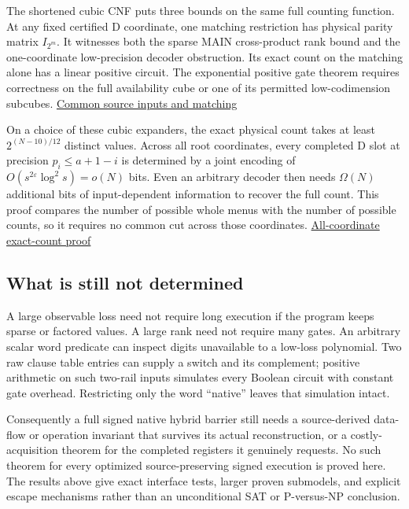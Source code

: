 \documentclass[
  11pt,
]{article}
\begin{document}
The shortened cubic CNF puts three bounds on the same full counting
function. At any fixed certified D coordinate, one matching restriction
has physical parity matrix \(I_{2^m}\). It witnesses both the sparse
MAIN cross-product rank bound and the one-coordinate low-precision
decoder obstruction. Its exact count on the matching alone has a linear
positive circuit. The exponential positive gate theorem requires
correctness on the full availability cube or one of its permitted
low-codimension subcubes. \hyperref[v8-section-common-native-family]{Common
source inputs and matching}

On a choice of these cubic expanders, the exact physical count takes at
least \(2^{(N-10)/12}\) distinct values. Across all root coordinates,
every completed D slot at precision \(p_i\le a+1-i\) is determined by a
joint encoding of \(O(s^{2\varepsilon}\log^2s)=o(N)\) bits. Even an
arbitrary decoder then needs \(\Omega(N)\) additional bits of
input-dependent information to recover the full count. This proof
compares the number of possible whole menus with the number of possible
counts, so it requires no common cut across those coordinates.
\hyperref[v8-section-pooled-menu-barrier]{All-coordinate exact-count proof}

\subsection{What is still not
determined}\label{v8-what-is-still-not-determined}

A large observable loss need not require long execution if the program
keeps sparse or factored values. A large rank need not require many
gates. An arbitrary scalar word predicate can inspect digits unavailable
to a low-loss polynomial. Two raw clause table entries can supply a
switch and its complement; positive arithmetic on such two-rail inputs
simulates every Boolean circuit with constant gate overhead. Restricting
only the word ``native'' leaves that simulation intact.

Consequently a full signed native hybrid barrier still needs a
source-derived data-flow or operation invariant that survives its actual
reconstruction, or a costly-acquisition theorem for the completed
registers it genuinely requests. No such theorem for every optimized
source-preserving signed execution is proved here. The results above
give exact interface tests, larger proven submodels, and explicit escape
mechanisms rather than an unconditional SAT or P-versus-NP conclusion.
\end{document}

